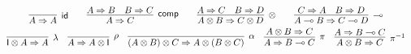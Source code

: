 \documentclass[submission,copyright,creativecommons]{eptcs}
\theoremstyle{definition}
\newcommand{\id}{\mathsf{id}}
\newcommand{\ot}{\otimes}
\newcommand{\lolli}{\multimap}
\newcommand{\I}{\mathsf{I}}
\begin{document}
\begin{displaymath}
  \def\arraystretch{1.5}
  \begin{array}{c}
        \infer[\id]{A \Rightarrow A}{}
        \qquad
        \infer[\mathsf{comp}]{A \Rightarrow C}{
          A \Rightarrow B
          &
          B \Rightarrow C
        }
        \qquad
      \infer[\otimes]{A \ot B \Rightarrow C \ot D}{
        A \Rightarrow C
        &
        B \Rightarrow D
      }
      \qquad
      \infer[\lolli]{A \lolli B \Rightarrow C \lolli D}{
        C \Rightarrow A
        &
        B \Rightarrow D
      }
      \\
      \infer[\lambda]{\I \ot A \Rightarrow A}{}
      \quad
      \infer[\rho]{A \Rightarrow A \ot \I}{}
      \quad
      \infer[\alpha]{(A \ot B) \ot C \Rightarrow A \ot (B \ot C)}{}
      \quad
      \infer[\pi]{A \Rightarrow B \lolli C}{A \ot B \Rightarrow C}
      \quad
      \infer[\pi^{-1}]{A \ot B \Rightarrow C}{A \Rightarrow B \lolli C}
  \end{array}
\end{displaymath}
\end{document}
